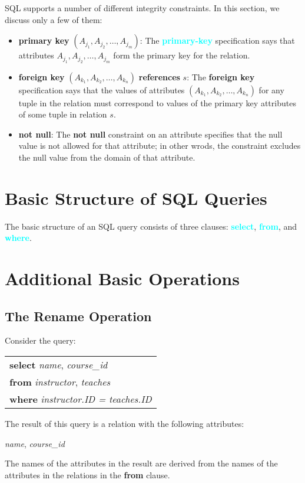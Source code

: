 \documentclass{Beautybook-EN}
\newcommand{\textcy}[1]{\textbf{\textcolor{cyan}{#1}}}
\begin{document}
SQL supports a number of different integrity constraints. In this section, we discuss only a few of them:
\begin{itemize}
    \item\textbf{primary key} $(A_{j_1},A_{j_2},\ldots,A_{j_m})$: The \textcy{primary-key} specification says that attributes $A_{j_1},A_{j_2},\ldots,A_{j_m}$ form the primary key for the relation.
    \item\textbf{foreign key} $(A_{k_1},A_{k_2},\ldots,A_{k_n})$ \textbf{references} $s$: The \textbf{foreign key} specification says that the values of attributes $(A_{k_1},A_{k_2},\ldots,A_{k_n})$ for any tuple in the relation must correspond to values of the primary key attributes of some tuple in relation $s$.
    \item\textbf{not null}: The \textbf{not null} constraint on an attribute specifies that the null value is not allowed for that attribute; in other wrods, the constraint excludes the null value from the domain of that attribute.
\end{itemize}

\section{Basic Structure of SQL Queries}

The basic structure of an SQL query consists of three clauses: \textcy{select}, \textcy{from}, and \textcy{where}.

\section{Additional Basic Operations}
\subsection{The Rename Operation}

Consider the query:
\begin{center}
    \begin{tabular}{l}
        \textbf{select} \textit{name}, \textit{course\_id}\\
        \textbf{from} \textit{instructor}, \textit{teaches}\\
        \textbf{where} \textit{instructor.ID = teaches.ID}
    \end{tabular}
\end{center}
The result of this query is a relation with the following attributes:
\begin{center}
    \textit{name}, \textit{course\_id}
\end{center}
The names of the attributes in the result are derived from the names of the attributes in the relations in the \textbf{from} clause.
\end{document}
